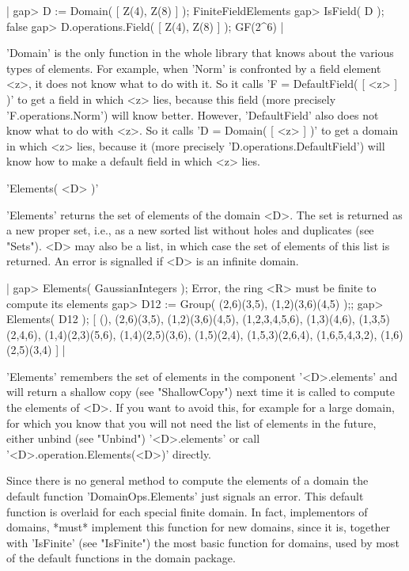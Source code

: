 |    gap> D := Domain( [ Z(4), Z(8) ] );
    FiniteFieldElements
    gap> IsField( D );
    false
    gap> D.operations.Field( [ Z(4), Z(8) ] );
    GF(2^6) |

'Domain'  is the only function  in the whole  {\GAP}  library  that knows
about the  various  types  of  elements.   For  example,  when  'Norm' is
confronted by a field element <z>, it does  not know what  to do with it.
So it calls 'F \:= DefaultField( [ <z> ] )' to  get  a field in which <z>
lies, because  this field (more precisely  'F.operations.Norm') will know
better.  However, 'DefaultField' also does not know  what to do with <z>.
So it calls 'D \:= Domain( [ <z> ] )' to get  a domain in which <z> lies,
because it (more precisely 'D.operations.DefaultField') will know  how to
make a default field in which <z> lies.

%

'Elements( <D> )'

'Elements'  returns the set of elements  of the  domain  <D>.  The set is
returned  as a new proper  set, i.e., as a  new sorted list without holes
and duplicates (see "Sets").  <D>  may also be  a list, in which case the
set of elements of this list  is returned.  An  error is signalled if <D>
is an infinite domain.

|    gap> Elements( GaussianIntegers );
    Error, the ring <R> must be finite to compute its elements
    gap> D12 := Group( (2,6)(3,5), (1,2)(3,6)(4,5) );;
    gap> Elements( D12 );
    [ (), (2,6)(3,5), (1,2)(3,6)(4,5), (1,2,3,4,5,6), (1,3)(4,6),
      (1,3,5)(2,4,6), (1,4)(2,3)(5,6), (1,4)(2,5)(3,6), (1,5)(2,4),
      (1,5,3)(2,6,4), (1,6,5,4,3,2), (1,6)(2,5)(3,4) ] |

'Elements' remembers the set of  elements in the component '<D>.elements'
and will return a shallow copy (see "ShallowCopy") next time it is called
to compute the elements of <D>.  If  you want to  avoid this, for example
for a large domain, for which you know that you will not need the list of
elements in the future,  either  unbind (see "Unbind")  '<D>.elements' or
call '<D>.operation.Elements(<D>)' directly.

Since there is no general method to compute the elements  of a domain the
default  function  'DomainOps.Elements'  just  signals  an  error.   This
default function  is  overlaid for each  special finite domain.  In fact,
implementors of domains, *must* implement this function  for new domains,
since it is,  together with 'IsFinite'  (see  "IsFinite")  the most basic
function for domains, used by most of the default functions in the domain
package.

